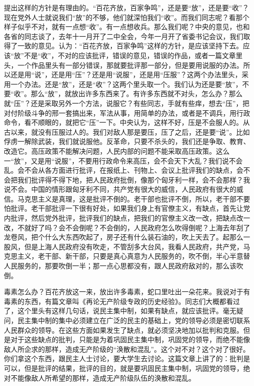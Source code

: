 提出这样的方针是有理由的。“百花齐放，百家争鸣”，还是要“放”，还是要“收”？现在党外人士就说我们“放”的不够，他们就深怕我们“收”。而我们同志呢？看那个样子似乎不对，就有一点想“收”。有一点想收兵。那么我们呢？中央的意见，也和各省的同志谈了，去年十一月开了二中全会，今年一月开了省委书记会议，我们取得了一致的意见。认为：“百花齐放，百家争鸣”这样的方针，是应该坚持下去。应该“放”不是“收”，不对的应该批评，错误的意见，错误的作品，或者一篇文章里头，一个作品里头有一部分错误，那就要批评那一部分，但是要用说服的办法。所以还是用“说”，还是用“压”？还是用“说服”，还是用“压服”？这两个办法里头，采用一个办法。还是“放”，还是“收”？这两个里头取一个。我们认为还是要“放”，不要“收”。那么“放”，就放出许多东西来了。有许多东西就不对头，怎么办？那么就“压”？还是采取另外一个方法，说服它？有些同志，手就有些痒，想去“压”，把对付阶级斗争的邢一套搞出来，军法从事，用简单的办法，或者是不调兵，用行政命令，看不顺眼的，就把它“压”一下。中央认为，这样不好，压是不会服人的。从古以来，就没有压服过人的。我们对敌人那是要压，压了之后，还是要“说”。比如俘虏一解除武装，我们就说服他。反革命，只要不杀头的，我们还是争取、教育、改造它。高压政策不能解决问题，人民内部的问题不能采取高压政策。这么一“放”，又是用“说服”，不要用行政命令来高压，会不会天下大乱？我们说不会乱。会不会从各方面进行批评，在报纸上、刊物上、会议上批评我们的缺点，会不会把我们批评得不得下地，把人民政府批倒，像那个匈牙利一样，会不会那样？我说不会。中国的情形跟匈牙利不同，共产党有很大的威信，人民政府有很大的威信。马克思主义是真理，这是批评不倒的。老干部也批评不倒，所以，老干部不要怕批评。老干部批评一下很有好处，如果我们身上有官僚主义，有缺点，首先让党内批评，然后党外批评，批评我们的缺点，把我们的官僚主义改一改，把缺点改一改，不就好了吗？会不会倒呢？不会倒的，人民政府怎么吹得倒呢？上海去年刮了龙卷风，把个什么大东西吹起了，房子还有什么装石油的，吹上天去了。起那么一股风，但是上海人民政府没有吹走，不管刮多大台风，我看人民政府，共产党，马克思主义，老干部、新干部，只要是真心真意为人民服务的，吹不倒，半心半意替人民服务的，那要吹倒一半；那一点心思都没有，跟人民政府敌对的，那么该吹倒。

毒素怎么办？百花齐放这一来，放出许多毒素，蛇口里吐出一朵花来。我说对于有毒素的东西，有篇文章叫《再论无产阶级专政的历史经验》。同志们大概都看过了，这个里头有这样几句话，说民主集中制，如果有缺点，就应该批评。毫无疑问，民主集中制的集中必须建立在广泛的民主的基础上，党的领导必须是密切联系人民群众的领导。在这些方面如果发生了缺点，就必须坚决地加以批判和克服。但是对于这些缺点的批判，只能是为着巩固民主集中制，巩固党的领导，而绝不能像敌人所企求的那样，造成无产阶级的“涣散和混乱”。这个对不对？这个对了很好。你们拿这个东西，跟民主人士讨论，要大学生去讨论。这篇文章上讲了的：批判是可以，但是批评的结果，批评的目的，就是要巩固民主集中制，巩固党的领导，绝对不能像敌人所希望的那样，造成无产阶级队伍的涣散和混乱。

